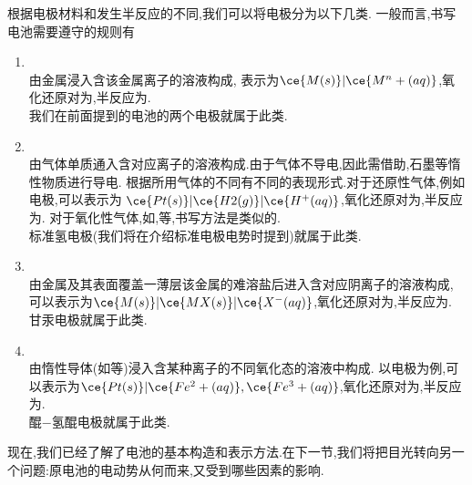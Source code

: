 \documentclass{ctexart}
\begin{document}
\begin{theorem}[6B.2.4 电极的种类]
    根据电极材料和发生半反应的不同,我们可以将电极分为以下几类.
    一般而言,书写电池需要遵守的规则有
    \begin{enumerate}[topsep=0pt,parsep=0pt,itemsep=0pt,partopsep=0pt,label=\tbf{(\arabic*)},leftmargin=*]
        \item {}\\
            由金属浸入含该金属离子的溶液构成,%
            表示为$\ce{M(s)}\vert\ce{M^n+(aq)}$,氧化还原对为,半反应为.\\
            我们在前面提到的电池的两个电极就属于此类.
        \item {}\\
            由气体单质通入含对应离子的溶液构成.由于气体不导电,因此需借助,石墨等惰性物质进行导电.%
            根据所用气体的不同有不同的表现形式.对于还原性气体,例如电极,可以表示为%
            $\ce{Pt(s)}\vert\ce{H2(g)}\vert\ce{H^+(aq)}$,氧化还原对为,半反应为.%
            对于氧化性气体,如,等,书写方法是类似的.\\
            标准氢电极(我们将在介绍标准电极电势时提到)就属于此类.
        \item {}\\
            由金属及其表面覆盖一薄层该金属的难溶盐后进入含对应阴离子的溶液构成,%
            可以表示为$\ce{M(s)}\vert\ce{MX(s)}\vert\ce{X^-(aq)}$,氧化还原对为,半反应为.\\
            甘汞电极就属于此类.
        \item {}\\
            由惰性导体(如等)浸入含某种离子的不同氧化态的溶液中构成.%
            以电极为例,可以表示为$\ce{Pt(s)}\vert\ce{Fe^2+(aq)},\ce{Fe^3+(aq)}$,氧化还原对为,半反应为.\\
            醌$-$氢醌电极就属于此类.
    \end{enumerate}
\end{theorem}
现在,我们已经了解了电池的基本构造和表示方法.在下一节,我们将把目光转向另一个问题:原电池的电动势从何而来,又受到哪些因素的影响.
\end{document}

